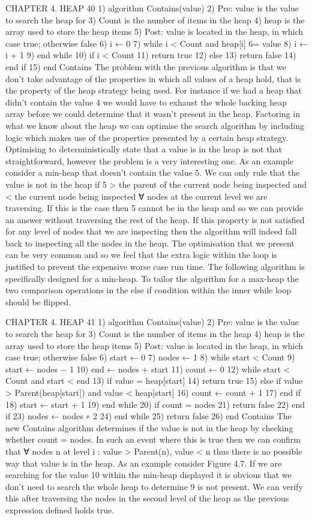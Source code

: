 \documentclass{article}
\begin{document}
CHAPTER 4. HEAP 40
1) algorithm Contains(value)
2) Pre: value is the value to search the heap for
3) Count is the number of items in the heap
4) heap is the array used to store the heap items
5) Post: value is located in the heap, in which case true; otherwise false
6) i ← 0
7) while i < Count and heap[i] 6= value
8) i ← i + 1
9) end while
10) if i < Count
11) return true
12) else
13) return false
14) end if
15) end Contains
The problem with the previous algorithm is that we don’t take advantage
of the properties in which all values of a heap hold, that is the property of the
heap strategy being used. For instance if we had a heap that didn’t contain the
value 4 we would have to exhaust the whole backing heap array before we could
determine that it wasn’t present in the heap. Factoring in what we know about
the heap we can optimise the search algorithm by including logic which makes
use of the properties presented by a certain heap strategy.
Optimising to deterministically state that a value is in the heap is not that
straightforward, however the problem is a very interesting one. As an example
consider a min-heap that doesn’t contain the value 5. We can only rule that the
value is not in the heap if 5 > the parent of the current node being inspected
and < the current node being inspected ∀ nodes at the current level we are
traversing. If this is the case then 5 cannot be in the heap and so we can
provide an answer without traversing the rest of the heap. If this property is
not satisfied for any level of nodes that we are inspecting then the algorithm
will indeed fall back to inspecting all the nodes in the heap. The optimisation
that we present can be very common and so we feel that the extra logic within
the loop is justified to prevent the expensive worse case run time.
The following algorithm is specifically designed for a min-heap. To tailor the
algorithm for a max-heap the two comparison operations in the else if condition
within the inner while loop should be flipped.

CHAPTER 4. HEAP 41
1) algorithm Contains(value)
2) Pre: value is the value to search the heap for
3) Count is the number of items in the heap
4) heap is the array used to store the heap items
5) Post: value is located in the heap, in which case true; otherwise false
6) start ← 0
7) nodes ← 1
8) while start < Count
9) start ← nodes − 1
10) end ← nodes + start
11) count ← 0
12) while start < Count and start < end
13) if value = heap[start]
14) return true
15) else if value > Parent(heap[start]) and value < heap[start]
16) count ← count + 1
17) end if
18) start ← start + 1
19) end while
20) if count = nodes
21) return false
22) end if
23) nodes ← nodes ∗ 2
24) end while
25) return false
26) end Contains
The new Contains algorithm determines if the value is not in the heap by
checking whether count = nodes. In such an event where this is true then we
can confirm that ∀ nodes n at level i : value > Parent(n), value < n thus there
is no possible way that value is in the heap. As an example consider Figure 4.7.
If we are searching for the value 10 within the min-heap displayed it is obvious
that we don’t need to search the whole heap to determine 9 is not present. We
can verify this after traversing the nodes in the second level of the heap as the
previous expression defined holds true.
\end{document}
